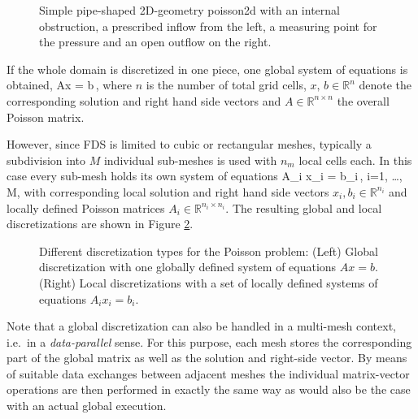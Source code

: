 \begin{figure}[h]
\begin{center}

\end{center}
\caption[Simple pipe-shaped geometry in 2D]{Simple pipe-shaped 2D-geometry {\ct poisson2d} with an internal obstruction, a prescribed inflow from the left, a measuring point for the pressure and an open outflow on the right.}
\label{FIG_basic_pipe_geometry}
\end{figure}

\newpage
If the whole domain is discretized in one piece, one global system of equations is 
obtained,
\be 
  Ax = b\,, 
  \label{EQ_SCARC_single_system}
\ee
where $n$ is the number of total grid cells, 
$x, \,b\in\mathbb{R}^n$ denote the corresponding solution and right hand side vectors and $A \in \mathbb{R}^{n \times n}$ the overall Poisson matrix. 

However, since FDS is limited to cubic or rectangular meshes, typically a subdivision into $M$ individual sub-meshes is used with $n_m$ local cells each. In this case every sub-mesh holds its own system of equations 
\be 
   A_i x_i = b_i\,, \qquad i=1, \ldots, M, 
  \label{EQ_SCARC_multi_system}
\ee
with corresponding local solution and right hand side vectors $x_i, b_i \in \mathbb{R}^{n_i}$ and locally defined Poisson matrices $A_i \in \mathbb{R}^{n_i\times n_i}$. The resulting global and local discretizations are shown in Figure \ref{FIG_global_vs_local_discretization}.


\begin{figure}[h]
\begin{center}
\quad\quad

\end{center}
\caption[Global discretization versus collection of local discretizations]{Different discretization types for the Poisson problem: (Left) Global discretization with one globally defined system of equations $Ax=b$. (Right) Local discretizations with a set of locally defined systems of equations $A_ix_i=b_i$.}
\label{FIG_global_vs_local_discretization}
\end{figure}
Note that a global discretization can also be handled in a multi-mesh context, i.e.\ in a {\it data-parallel} sense. 
For this purpose, each mesh stores the corresponding part of the global matrix as well as the solution and right-side vector. 
By means of suitable data exchanges between adjacent meshes the individual matrix-vector operations are then performed 
in exactly the same way as would also be the case with an actual global execution.

